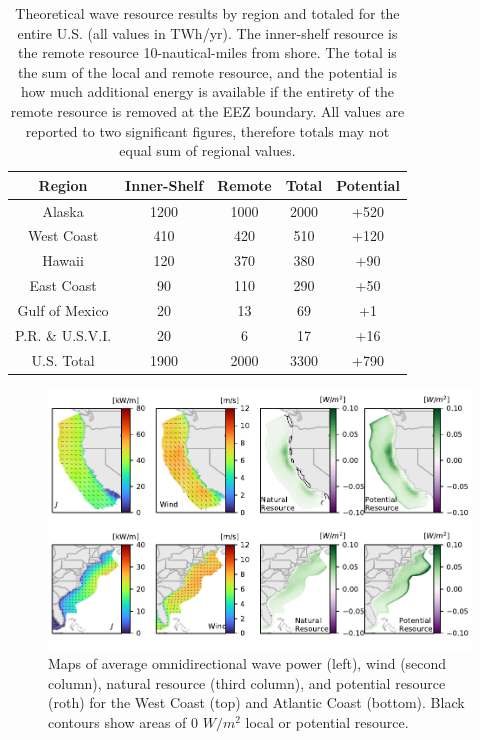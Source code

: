 \begin{table}[ht]
  \centering
  \begin{tabular}{|c|c|c|c|c|}
    \hline
    Region & Inner-Shelf & Remote & Total & Potential \\
    \hline
    Alaska & 1200 & 1000 & 2000 & +520 \\
    West Coast & 410 & 420 & 510 & +120 \\
    Hawaii & 120 & 370 & 380 & +90 \\
    East Coast & 90 & 110 & 290 & +50 \\
    Gulf of Mexico & 20 & 13 & 69 & +1 \\
    P.R. \& U.S.V.I. & 20 & 6 & 17 & +16 \\
    \hline \hline
    U.S. Total & 1900 & 2000 & 3300 & +790 \\
    \hline
  \end{tabular}
  \caption{Theoretical wave resource results by region and totaled for the entire U.S. (all values in TWh/yr). The inner-shelf resource is the remote resource 10-nautical-miles from shore. The total is the sum of the local and remote resource, and the potential is how much additional energy is available if the entirety of the remote resource is removed at the EEZ boundary. All values are reported to two significant figures, therefore totals may not equal sum of regional values.
  }
  \label{table:totals}
\end{table}



\begin{figure}[ht]
  \centering
  \includegraphics[width=\textwidth]{../fig/Yearly_spatial_seasonal_mag_6.pdf}
  \caption{Maps of average omnidirectional wave power (left), wind (second column), natural resource (third column), and potential resource (roth) for the West Coast (top) and Atlantic Coast (bottom). Black contours show areas of 0 $W/m^{2}$ local or potential resource.}
  \label{fig:maps}
\end{figure}

